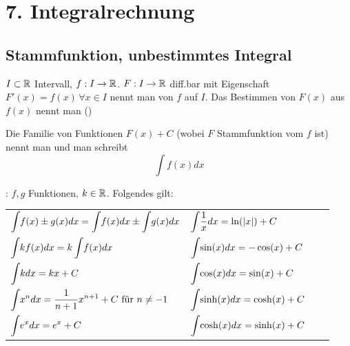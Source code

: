 \section{7. Integralrechnung}

\subsection{Stammfunktion, unbestimmtes Integral}

\Def $I \subset \mathbb{R}$ Intervall, $f: I \to \mathbb{R}$. $F: I \to \mathbb{R}$ diff.bar mit Eigenschaft
$F'(x) = f(x) \, \forall x \in I$ nennt man  von $f$ auf $I$. Das 
Bestimmen von $F(x)$ aus $f(x)$ nennt man () 

\Def Die Familie von Funktionen $F(x) + C$ (wobei $F$ Stammfunktion vom  $f$ ist)
nennt man  und man schreibt
$$\int f(x) dx$$

\Satz {}: $f,g$ Funktionen, $k \in \mathbb{R}$. Folgendes gilt:
\vspace{-0.6em}

\begin{tabular}{llll}
    $\displaystyle \int \hspace{-2pt} f(x) \pm g(x)dx = \int \hspace{-2pt} f(x) dx \pm \int \hspace{-2pt} g(x) dx$ & \hspace{-14pt}
    $\displaystyle \int \hspace{-2pt} \frac{1}{x} dx = \ln(|x|) + C$ \\
    
    $\displaystyle \int \hspace{-2pt} k f(x) dx = k \int \hspace{-2pt} f(x) dx$ & \hspace{-14pt}
    $\displaystyle \int \hspace{-2pt} \sin(x) dx = -\cos(x) + C$ \\
    
    $\displaystyle \int \hspace{-2pt} k dx = kx + C$ & \hspace{-14pt}
    $\displaystyle \int \hspace{-2pt} \cos(x) dx = \sin(x) + C$ \\
    
    $\displaystyle \int \hspace{-2pt} x^n dx = \frac{1}{n+1}x^{n+1} + C \text{ für } n \ne -1$ & \hspace{-14pt}
    $\displaystyle \int \hspace{-2pt} \sinh(x) dx = \cosh(x) + C$ \\
    
    $\displaystyle \int \hspace{-2pt} e^x dx = e^x + C$ & \hspace{-14pt}
    $\displaystyle \int \hspace{-2pt} \cosh(x) dx = \sinh(x) + C$
\end{tabular}

